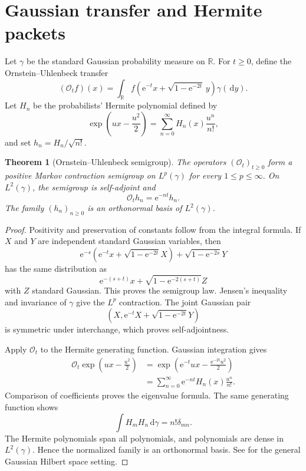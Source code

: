 \documentclass[11pt,letterpaper]{article}
\newtheorem{theorem}{Theorem}[section]
\theoremstyle{plain}
\theoremstyle{plain}
\theoremstyle{plain}
\theoremstyle{definition}
\theoremstyle{definition}
\theoremstyle{definition}
\theoremstyle{definition}
\theoremstyle{definition}
\theoremstyle{remark}
\theoremstyle{remark}
\theoremstyle{remark}
\theoremstyle{remark}
\theoremstyle{remark}
\theoremstyle{remark}
\newcommand{\RR}{\mathbb R}
\newcommand{\Ocal}{\mathcal O}
\newcommand{\e}{\mathrm e}
\newcommand{\dd}{\,\mathrm d}
\let\KomorebiPrimitiveMathcal\mathcal
\renewcommand{\mathcal}[1]{{\KomorebiPrimitiveMathcal{#1}}}
\let\KomorebiPrimitivemathbb\mathbb
\renewcommand{\mathbb}[1]{{\KomorebiPrimitivemathbb{#1}}}
\let\KomorebiPrimitivemathrm\mathrm
\renewcommand{\mathrm}[1]{{\KomorebiPrimitivemathrm{#1}}}
\begin{document}
\FloatBarrier
\section{Gaussian transfer and Hermite packets}\label{extended:section:07}\label{extended:sec:ou_hermite}

Let \(\gamma\) be the standard Gaussian probability measure on \(\RR\). For \(t\geq0\), define the Ornstein--Uhlenbeck transfer
\[
(\Ocal_t f)(x)
=
\int_\RR
f\left(
\e^{-t}x+\sqrt{1-\e^{-2t}}\,y
\right)
\gamma(\dd y).
\]
Let \(H_n\) be the probabilists' Hermite polynomial defined by
\[
\exp\left(ux-\frac{u^2}{2}\right)
=
\sum_{n=0}^\infty H_n(x)\frac{u^n}{n!},
\]
and set \(h_n=H_n/\sqrt{n!}\).

\begin{theorem}[Ornstein--Uhlenbeck semigroup]\label{extended:record:040}\label{extended:thm:ou_semigroup}
The operators \((\Ocal_t)_{t\geq0}\) form a positive Markov contraction semigroup on \(L^p(\gamma)\) for every \(1\leq p\leq\infty\). On \(L^2(\gamma)\), the semigroup is self-adjoint and
\[
\Ocal_t h_n=\e^{-nt}h_n.
\]
The family \((h_n)_{n\geq0}\) is an orthonormal basis of \(L^2(\gamma)\).
\end{theorem}

\begin{proof}
Positivity and preservation of constants follow from the integral formula. If \(X\) and \(Y\) are independent standard Gaussian variables, then
\[
\e^{-s}
\left(
\e^{-t}x+\sqrt{1-\e^{-2t}}X
\right)
+
\sqrt{1-\e^{-2s}}Y
\]
has the same distribution as
\[
\e^{-(s+t)}x
+
\sqrt{1-\e^{-2(s+t)}}Z
\]
with \(Z\) standard Gaussian. This proves the semigroup law. Jensen's inequality and invariance of \(\gamma\) give the \(L^p\) contraction. The joint Gaussian pair
\[
\left(
X,
\e^{-t}X+\sqrt{1-\e^{-2t}}Y
\right)
\]
is symmetric under interchange, which proves self-adjointness.

Apply \(\Ocal_t\) to the Hermite generating function. Gaussian integration gives
\[
\begin{aligned}
\Ocal_t
\exp\left(ux-\frac{u^2}{2}\right)
&=
\exp\left(
\e^{-t}ux-
\frac{\e^{-2t}u^2}{2}
\right)\\
&=
\sum_{n=0}^\infty
\e^{-nt}H_n(x)\frac{u^n}{n!}.
\end{aligned}
\]
Comparison of coefficients proves the eigenvalue formula. The same generating function shows
\[
\int H_mH_n\dd\gamma=n!\delta_{mn}.
\]
The Hermite polynomials span all polynomials, and polynomials are dense in \(L^2(\gamma)\). Hence the normalized family is an orthonormal basis. See \cite{Janson1997} for the general Gaussian Hilbert space setting.
\end{proof}
\end{document}
